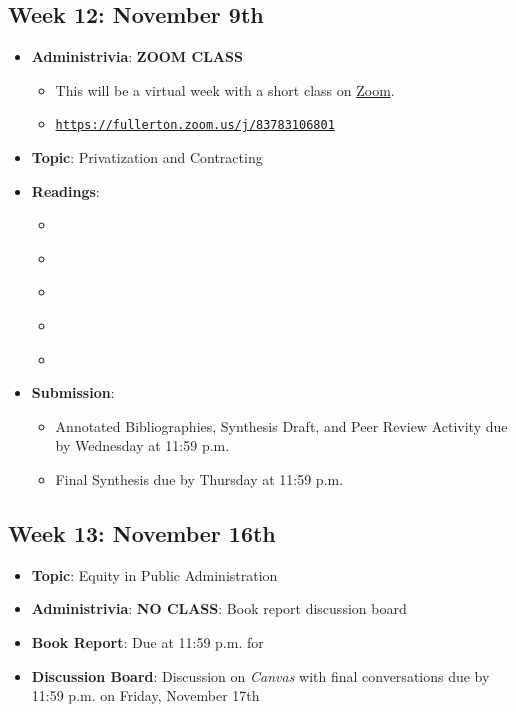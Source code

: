 \documentclass[12pt, letterpaper]{article}
\begin{document}
\subsection*{Week 12: November 9th}
    \begin{itemize}
        \item \textbf{Administrivia}: \textbf{ZOOM CLASS}  
            \begin{itemize}
                \item This will be a virtual week with a short class on \href{https://fullerton.zoom.us/j/83783106801}{Zoom}.
                \item \href{https://fullerton.zoom.us/j/83783106801}{\texttt{https://fullerton.zoom.us/j/83783106801}}
            \end{itemize}
        \item \textbf{Topic}: Privatization and Contracting
        \item \textbf{Readings}:
            \begin{itemize}
                \item \cite{Brown2016}
                \item \cite{Cohen2008}
                \item \cite{Hefetz2014}
                \item \cite{Jos2010}
                \item \cite{Lamothe2012}
            \end{itemize}
        \item \textbf{Submission}: 
            \begin{itemize}
                \item Annotated Bibliographies, Synthesis Draft, and Peer Review Activity due by Wednesday at 11:59 p.m. 
                \item Final Synthesis due by Thursday at 11:59 p.m.
            \end{itemize}
    \end{itemize}

\subsection*{Week 13: November 16th}
    \begin{itemize}
        \item \textbf{Topic}: Equity in Public Administration
        \item \textbf{Administrivia}: \textbf{NO CLASS}: Book report discussion board
        \item \textbf{Book Report}: Due at 11:59 p.m. for \cite{Gooden2014}
        \item \textbf{Discussion Board}: Discussion on \textit{Canvas} with final conversations due by 11:59 p.m. on Friday, November 17th
    \end{itemize}
\end{document}
